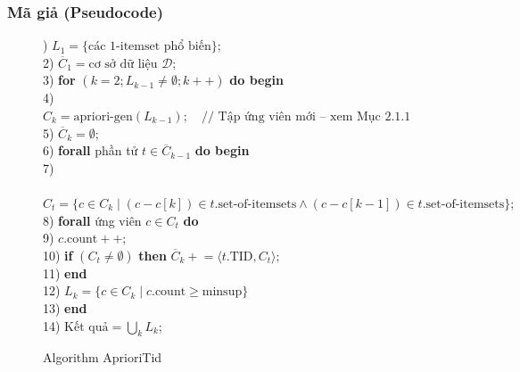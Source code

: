 \documentclass[12pt]{article}
\begin{document}
\subsubsection{Mã giả (Pseudocode)}
\begin{figure}[h]
    ) \hspace*{0.3em} $L_1 = \{\text{các 1-itemset phổ biến}\};$ \\
    2) \hspace*{0.3em} $\overline{C}_1 = \text{cơ sở dữ liệu } \mathcal{D};$ \\
    3) \hspace*{0.3em} \textbf{for} $( k = 2; L_{k-1} \neq \emptyset; k++ )$ \textbf{do begin} \\
    4) \hspace*{1.5em} $C_k = \text{apriori-gen}(L_{k-1}); \quad \text{// Tập ứng viên mới -- xem Mục 2.1.1}$ \\
    5) \hspace*{1.5em} $\overline{C}_k = \emptyset;$ \\
    6) \hspace*{1.5em} \textbf{forall} phần tử $t \in \overline{C}_{k-1}$ \textbf{do begin} \\
    7) \hspace*{3em}  \\ 
    \hspace*{4.2em}  \\
    \hspace*{4.2em} $C_t = \{c \in C_k \mid (c - c[k]) \in t.\text{set-of-itemsets} \land (c - c[k-1]) \in t.\text{set-of-itemsets}\};$ \\
    8) \hspace*{3em} \textbf{forall} ứng viên $c \in C_t$ \textbf{do} \\
    9) \hspace*{4.5em} $c.\text{count}++;$ \\
    10) \hspace*{2.5em} \textbf{if} $(C_t \neq \emptyset)$ \textbf{then} $\overline{C}_k \mathrel{+}= \langle t.\text{TID}, C_t \rangle;$ \\
    11) \hspace*{1.5em} \textbf{end} \\
    12) \hspace*{1.5em} $L_k = \{c \in C_k \mid c.\text{count} \geq \text{minsup}\}$ \\
    13) \hspace*{0.3em} \textbf{end} \\
    14) \hspace*{0.3em} $\text{Kết quả} = \bigcup_k L_k$;

    \caption{Algorithm AprioriTid}
    \label{fig:AprioriTid}
\end{figure}
\end{document}
